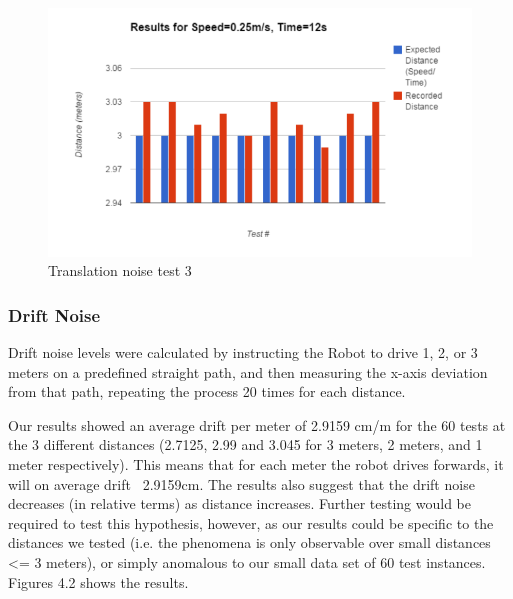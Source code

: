 \documentclass{article}
\begin{document}
	\begin{figure}[H]
	\centering
	\includegraphics[width=\linewidth]{ExperimentalResults3}
	\caption{Translation noise test 3}
	\end{figure}

	\newpage
	\subsubsection{Drift Noise}
	Drift noise levels were calculated by instructing the Robot to drive 1, 2, or 3 meters on a predefined straight path, and then measuring the x-axis deviation from that path, repeating the process 20 times for each distance.

Our results showed an average drift per meter of 2.9159 cm/m for the 60 tests at the 3 different distances (2.7125, 2.99 and 3.045 for 3 meters, 2 meters, and 1 meter respectively). This means that for each meter the robot drives forwards, it will on average drift ~2.9159cm. The results also suggest that the drift noise decreases (in relative terms) as distance increases. Further testing would be required to test this hypothesis, however, as our results could be specific to the distances we tested (i.e. the phenomena is only observable over small distances <= 3 meters), or simply anomalous to our small data set of 60 test instances. Figures 4.2 shows the results.
	
\end{document}
